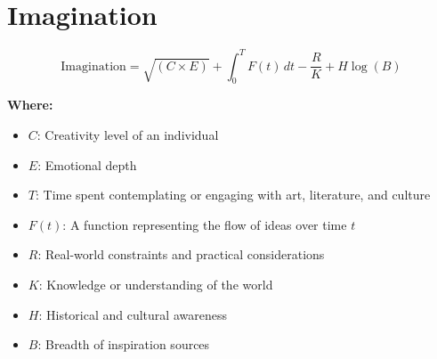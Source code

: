 \chapter{Imagination}

\begin{equation}
\text{Imagination} = \sqrt{\left(C \times E\right)} + \int_{0}^{T} F(t) \, dt - \frac{R}{K} + H \log(B)
\end{equation}

\textbf{Where:}

\begin{itemize}
    \item $C$: Creativity level of an individual
    \item $E$: Emotional depth
    \item $T$: Time spent contemplating or engaging with art, literature, and culture
    \item $F(t)$: A function representing the flow of ideas over time $t$
    \item $R$: Real-world constraints and practical considerations
    \item $K$: Knowledge or understanding of the world
    \item $H$: Historical and cultural awareness
    \item $B$: Breadth of inspiration sources
\end{itemize}